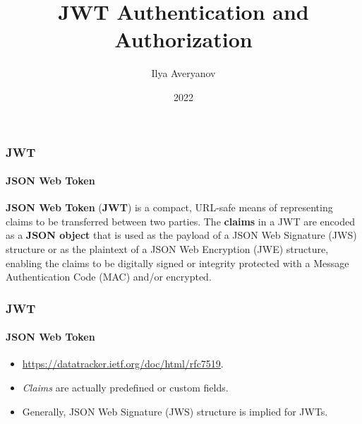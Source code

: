 \documentclass{beamer}
\title{JWT Authentication and Authorization}
\author{Ilya Averyanov}
\institute{EMQX}
\date{2022}
\begin{document}
\frame{\titlepage}







\begin{frame}
    \frametitle{JWT}
    \framesubtitle{JSON Web Token}

    \textbf{JSON Web Token} (\textbf{JWT}) is a compact, URL-safe means of representing
    claims to be transferred between two parties. The \textbf{claims} in a JWT
    are encoded as a \textbf{JSON object} that is used as the payload of a JSON
    Web Signature (JWS) structure or as the plaintext of a JSON Web
    Encryption (JWE) structure, enabling the claims to be digitally
    signed or integrity protected with a Message Authentication Code
    (MAC) and/or encrypted.
\end{frame}

\begin{frame}
    \frametitle{JWT}
    \framesubtitle{JSON Web Token}

    \begin{itemize}
        \item \href{https://datatracker.ietf.org/doc/html/rfc7519}{https://datatracker.ietf.org/doc/html/rfc7519}.
        \item \textit{Claims} are actually predefined or custom fields.
        \item Generally, JSON Web Signature (JWS) structure is implied for JWTs.
    \end{itemize}
\end{frame}
\end{document}
